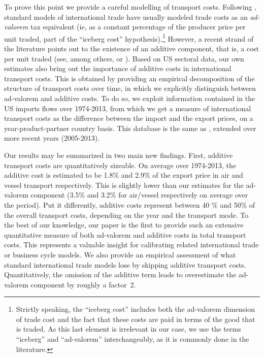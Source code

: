 \documentclass[a4paper,11pt]{article}
\begin{document}
To prove this point we provide a careful modelling of transport costs. Following \citet{samuelson1954}, standard models of international trade have usually modeled trade costs as an \emph{ad-valorem} tax equivalent (ie, as a constant percentage of the producer price per unit traded, part of the ``iceberg cost'' hypothesis).\footnote{Strictly speaking, the ``iceberg cost'' includes both the ad-valorem dimension of trade cost and the fact that these costs are paid in terms of the good that is traded. As this last element is irrelevant in our case, we use the terms ``iceberg'' and ``ad-valorem'' interchangeably, as it is commonly done in the literature.} However, a recent strand of the literature points out to the existence of an additive component, that is, a cost per unit traded (see, among others, \citealp{Irrazabal_2015} or \citealp{martin2012}). Based on US sectoral data, our own estimates also bring out the importance of additive costs in international transport costs. This is obtained by providing an empirical decomposition of the structure of transport costs over time, in which we explicitly distinguish between ad-valorem and additive costs. To do so, we exploit information contained in the US imports flows over 1974-2013, from which we get a measure of international transport costs as the difference between the import and the export prices, on a year-product-partner country basis. This database is the same as \cite{hummels2007}, extended over more recent years (2005-2013). \smallskip

Our results may be summarized in two main new findings. First, additive transport costs are quantitatively sizeable. On average over 1974-2013, the additive cost is estimated to be 1.8\% and 2.9\% of the export price in air and vessel transport respectively. This is slightly lower than our estimates for the ad-valorem component (3.5\% and 3.2\% for air/vessel respectively on average over the period). Put it differently, additive costs represent between 40 \% and 50\% of the overall transport costs, depending on the year and the transport mode. To the best of our knowledge, our paper is the first to provide such an extensive quantitative measure of both ad-valorem and additive costs in total transport costs. This represents a valuable insight for calibrating related international trade or business cycle models. We also provide an empirical assessment of what standard international trade models lose by skipping additive transport costs. Quantitatively, the omission of the additive term leads to overestimate the ad-valorem component by roughly a factor~2.
\end{document}
